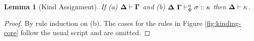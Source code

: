 \documentclass[12pt]{article}
\newtheorem{lemma}{Lemma}
\newcommand{\pfcase}[1]{\textbf{Case}~#1. }
\begin{document}
\begin{lemma}[Kind Assignment]
If (a) $\boldsymbol\Delta \vdash \boldsymbol\Gamma$ and (b) $\boldsymbol\Delta~\boldsymbol\Gamma \vdash_{\Phi}^{n} \sigma :: \kappa$ then $\boldsymbol\Delta \vdash \kappa$.
\end{lemma}
\begin{proof} By rule induction on (b). The cases for the rules in Figure \ref{fig:kinding-core} follow the usual script and are omitted.











\end{proof}
\end{document}
